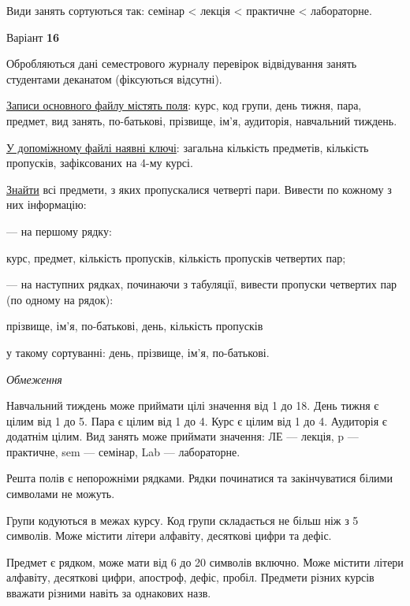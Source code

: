 \documentclass[11pt, ukrainian]{article}
\begin{document}
Види занять сортуються так: семінар < лекція < практичне < лабораторне.



\par
\newpage
{\center Варіант  \No \textbf { 16 }\par}
\bigskip
Обробляються дані семестрового журналу перевірок відвідування занять студентами деканатом (фіксуються відсутні). 

\underline{Записи основного файлу містять поля}: курс, код групи, день тижня, пара, предмет, вид занять, по-батькові, прізвище, ім’я, аудиторія, навчальний тиждень.

\underline{У допоміжному файлі наявні ключі}: загальна кількість предметів, кількість пропусків, зафіксованих на 4-му курсі.

\underline{Знайти} всі предмети, з яких пропускалися четверті пари. Вивести по кожному з них інформацію:\par
{\noindent}--- на першому рядку:\par
курс, предмет, кількість пропусків, кількість пропусків четвертих пар;

{\noindent}--- на наступних рядках, починаючи з табуляції, вивести пропуски четвертих пар (по одному на рядок):\par
прізвище, ім’я, по-батькові, день, кількість пропусків

{\noindent}у такому сортуванні: день, прізвище, ім’я, по-батькові.


\bigskip\textit{Обмеження}

Навчальний тиждень може приймати цілі значення від 1 до 18.
День тижня є цілим від 1 до 5. Пара є цілим від 1 до 4.
Курс є цілим від 1 до 4. Аудиторія є додатнім цілим.
Вид занять може приймати значення:
ЛЕ --- лекція, p --- практичне, sem --- семінар, Lab --- лабораторне.

Решта полів є непорожніми рядками.
Рядки починатися та закінчуватися білими символами не можуть.

Групи кодуються в межах курсу.
Код групи складається не більш ніж з 5 символів.
Може містити літери алфавіту, десяткові цифри та дефіс.

Предмет є рядком, може мати від 6 до 20 символів включно.
Може містити літери алфавіту, десяткові цифри, апостроф, дефіс, пробіл.
Предмети різних курсів вважати різними навіть за однакових назв.
\end{document}
